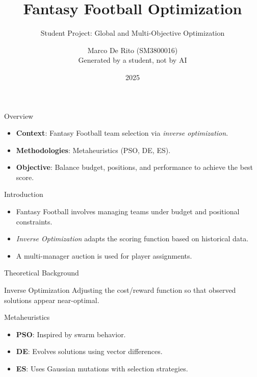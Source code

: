 \documentclass{beamer}
\title{Fantasy Football Optimization}
\subtitle{Student Project: Global and Multi-Objective Optimization}
\author{Marco De Rito (SM3800016) \\ \small{Generated by a student, not by AI}}
\institute{University of Trieste}
\date{2025}
\begin{document}
	
	\begin{frame}
		\titlepage
	\end{frame}
	
	\begin{frame}{Overview}
		\begin{itemize}
			\item \textbf{Context}: Fantasy Football team selection via \emph{inverse optimization}.
			\item \textbf{Methodologies}: Metaheuristics (PSO, DE, ES).
			\item \textbf{Objective}: Balance budget, positions, and performance to achieve the best score.
		\end{itemize}
	\end{frame}
	
	\begin{frame}{Introduction}
		\begin{itemize}
			\item Fantasy Football involves managing teams under budget and positional constraints.
			\item \emph{Inverse Optimization} adapts the scoring function based on historical data.
			\item A multi-manager auction is used for player assignments.
		\end{itemize}
	\end{frame}
	
	\begin{frame}{Theoretical Background}
		\begin{block}{Inverse Optimization}
			Adjusting the cost/reward function so that observed solutions appear near-optimal.
		\end{block}
		\begin{block}{Metaheuristics}
			\begin{itemize}
				\item \textbf{PSO}: Inspired by swarm behavior.
				\item \textbf{DE}: Evolves solutions using vector differences.
				\item \textbf{ES}: Uses Gaussian mutations with selection strategies.
			\end{itemize}
		\end{block}
	\end{frame}
	
\end{document}
